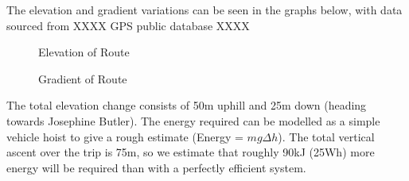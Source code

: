 \documentclass[journal,10pt]{IEEEtran}
\begin{document}
            The elevation and gradient variations can be seen in the graphs below, with data sourced from XXXX GPS public database XXXX
            \begin{figure}[H]
                \centering
                \caption{Elevation of Route}
                \label{fig:elevation}
            \end{figure}
            \begin{figure}[H]
                \centering
                \caption{Gradient of Route}
                \label{fig:gradient}
            \end{figure}
            The total elevation change consists of 50m uphill and 25m down (heading towards Josephine Butler). The energy required can be modelled as a simple vehicle hoist to give a rough estimate (Energy = $mg\Delta h$). The total vertical ascent over the trip is 75m, so we estimate that roughly 90kJ (25Wh) more energy will be required than with a perfectly efficient system.
\end{document}
